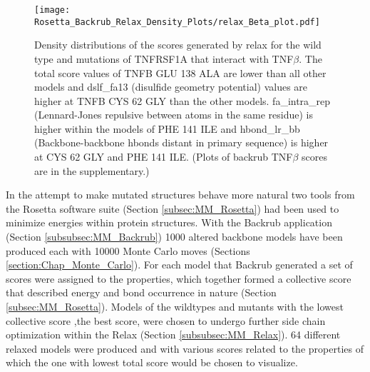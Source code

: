 	\newpage
		
	\begin{figure}[!ht]
		\centering
		\texttt{[image: Rosetta\_Backrub\_Relax\_Density\_Plots/relax\_Beta\_plot.pdf]}
		\caption[TNFRSF1A homotimer with TNF$\beta$ homotrimer relax score density plots]{Density distributions of the scores generated by relax for the wild type and mutations of TNFRSF1A that interact with TNF$\beta$. The total score values of TNFB GLU 138 ALA are lower than all other models and dslf\_fa13 (disulfide geometry potential) values are higher at TNFB CYS 62 GLY than the other models. fa\_intra\_rep (Lennard-Jones repulsive between atoms in the same residue) is higher within the models of PHE 141 ILE and hbond\_lr\_bb (Backbone-backbone hbonds distant in primary sequence) is higher at CYS 62 GLY and PHE 141 ILE.
		(Plots of backrub TNF$\beta$ scores are in the supplementary.)}
		\label{fig:relax_TNFB_scores}
	\end{figure}

	\newpage
	
	In the attempt to make mutated structures behave more natural two tools from the Rosetta software suite (Section \ref{subsec:MM_Rosetta}) had been used to minimize energies within protein structures. With the Backrub application (Section \ref{subsubsec:MM_Backrub}) 1000 altered backbone models have been produced each with 10000 Monte Carlo moves (Sections \ref{section:Chap_Monte_Carlo}). For each model that Backrub generated a set of scores were assigned to the properties, which together formed a collective score that described energy and bond occurrence in nature (Section \ref{subsec:MM_Rosetta}). Models of the wildtypes and mutants with the lowest collective score ,the best score, were chosen to undergo further side chain optimization within the Relax (Section \ref{subsubsec:MM_Relax}). 64 different relaxed models were produced and with various scores related to the properties of which the one with lowest total score would be chosen to visualize. 
	
